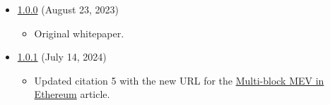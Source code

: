 \documentclass[tikz]{article}
\begin{document}
\begin{itemize}[topsep=0pt, itemsep=3pt,leftmargin=16pt]
    \item \href{https://github.com/BeanstalkFarms/Basin-Whitepaper/blob/main/version-history/basin1_0_0.pdf}{1.0.0} (August 23, 2023)
    
    \begin{itemize}
        \item Original whitepaper.
    \end{itemize}
    
    \item \href{https://github.com/BeanstalkFarms/Basin-Whitepaper/blob/main/version-history/basin1_0_1.pdf}{1.0.1} (July 14, 2024)
    
    \begin{itemize}
        \item Updated citation 5 with the new URL for the  \href{https://www.alvarorevuelta.com/posts/ethereum-mev-multiblock}{Multi-block MEV in Ethereum} article.
    \end{itemize}
\end{itemize}
\end{document}
